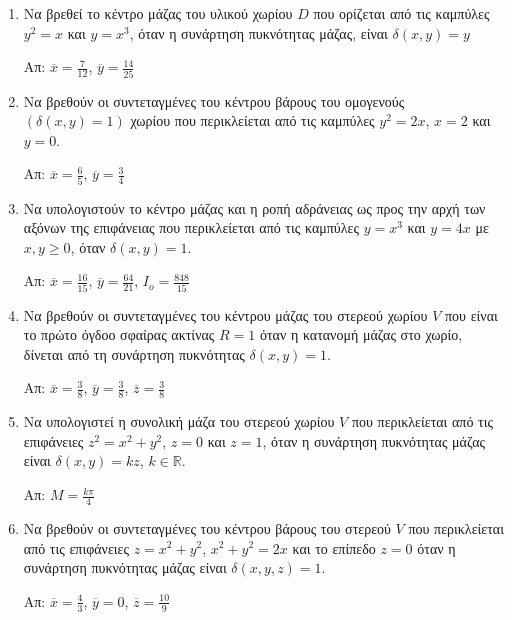 




\pagestyle{askhseis}



\begin{center}
  \minibox{\bfseries\large \textcolor{Col1}{Ασκήσεις στα Υλικά Χωρία}}
\end{center}

\vspace{\baselineskip}

\begin{enumerate}
  \item Να βρεθεί το κέντρο μάζας του υλικού χωρίου $D$ που ορίζεται από τις καμπύλες 
    $y^{2}=x$ και $y=x^{3}$, όταν η συνάρτηση πυκνότητας μάζας, είναι $\delta(x,y)=y$

  \hfill Απ: $\overline{x}=\frac{7}{12}$, $\overline{y}=\frac{14}{25}$

  \item Να βρεθούν οι συντεταγμένες του κέντρου βάρους του ομογενούς $(\delta(x,y)=1)$ 
    χωρίου που περικλείεται από τις καμπύλες $y^{2}=2x$, $x=2$ και $y=0$.

  \hfill Απ: $\overline{x}=\frac{6}{5}$, $\overline{y}=\frac{3}{4}$

  \item  Να υπολογιστούν το κέντρο μάζας και η ροπή αδράνειας ως προς την αρχή των 
    αξόνων της επιφάνειας που περικλείεται από τις καμπύλες $y=x^{3}$ και  $y=4x$ με 
    $x,y\geq 0$, όταν $\delta(x,y)=1$.

  \hfill Απ: $\overline{x}=\frac{16}{15}$, $\overline{y}=\frac{64}{21}$, 
  $I_{o}=\frac{848}{15}$

  \item Να βρεθούν οι συντεταγμένες του κέντρου μάζας του στερεού χωρίου $V$ που 
    είναι το πρώτο όγδοο σφαίρας ακτίνας $R=1$ όταν η κατανομή μάζας στο χωρίο, 
    δίνεται από τη συνάρτηση πυκνότητας $\delta(x,y)=1$.

  \hfill Απ: $\overline{x}=\frac{3}{8}$, $\overline{y}=\frac{3}{8}$, 
  $\overline{z}=\frac{3}{8}$

  \item Να υπολογιστεί η συνολική μάζα του στερεού χωρίου $V$ που περικλείεται 
    από τις επιφάνειες $z^{2}=x^{2}+y^{2}$, $z=0$ και $z=1$, όταν η 
    συνάρτηση πυκνότητας μάζας είναι $\delta(x,y)=kz$, $k\in\mathbb{R}$.

  \hfill Απ: $M=\frac{k\pi}{4}$

  \item Να βρεθούν οι συντεταγμένες του κέντρου βάρους του στερεού $V$ που 
    περικλείεται από τις επιφάνειες $z=x^{2}+y^{2}$, $x^{2}+y^{2}=2x$ και το επίπεδο 
    $z=0$ όταν η συνάρτηση πυκνότητας μάζας είναι $\delta(x,y,z)=1$.

  \hfill Απ: $\overline{x}=\frac{4}{3}$, $\overline{y}=0$, $\overline{z}=\frac{10}{9}$
\end{enumerate}



